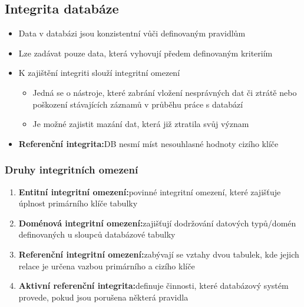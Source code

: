 \documentclass[a4paper,10pt]{article}
\newcommand{\pojem}[2]{\item \textbf{#1:}\quad #2}
\begin{document}
		\subsection{Integrita databáze}
			\begin{itemize} 
				\item Data v databázi jsou konzistentní vůči definovaným pravidlům
				\item Lze zadávat pouze data, která vyhovují předem definovaným kriteriím
				\item K zajištění integriti slouží integritní omezení
				\begin{itemize}
					\item Jedná se o nástroje, které zabrání vložení nesprávných dat či ztrátě nebo poškození stávajících záznamů v průběhu práce s databází
					\item Je možné zajistit mazání dat, která již ztratila svůj význam 
				\end{itemize}
				\pojem{Referenční integrita}{DB nesmí míst nesouhlasné hodnoty cizího klíče}		
			\end{itemize}
			
			\subsubsection{Druhy integritních omezení}
				\begin{enumerate}
					\pojem{Entitní integritní omezení}{povinné integritní omezení, které zajišťuje úplnost primárního klíče tabulky}
					\pojem{Doménová integritní omezení}{zajišťují dodržování datových typů/domén definovaných u sloupců databázové tabulky}
					\pojem{Referenční integritní omezení}{zabývají se vztahy dvou tabulek, kde jejich relace je určena vazbou primárního a cizího klíče}
					\pojem{Aktivní referenční integrita}{definuje činnosti, které databázový systém provede, pokud jsou porušena některá pravidla}
				\end{enumerate}
\end{document}
